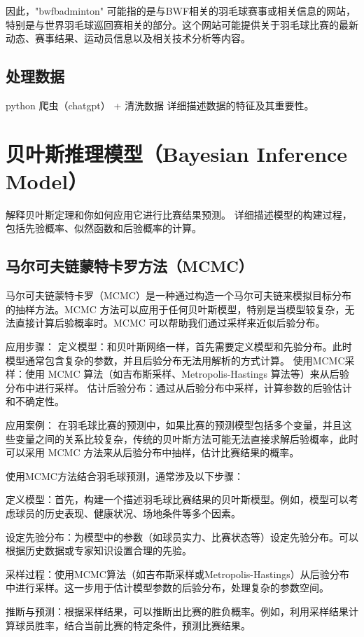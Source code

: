 \documentclass[12pt]{article}
\begin{document}
因此，"bwfbadminton" 可能指的是与BWF相关的羽毛球赛事或相关信息的网站，特别是与世界羽毛球巡回赛相关的部分。这个网站可能提供关于羽毛球比赛的最新动态、赛事结果、运动员信息以及相关技术分析等内容。


\subsection{处理数据}
python 爬虫（chatgpt） + 清洗数据
详细描述数据的特征及其重要性。


\section{贝叶斯推理模型（Bayesian Inference Model）}


解释贝叶斯定理和你如何应用它进行比赛结果预测。
详细描述模型的构建过程，包括先验概率、似然函数和后验概率的计算。

\subsection{马尔可夫链蒙特卡罗方法（MCMC）}
马尔可夫链蒙特卡罗（MCMC）是一种通过构造一个马尔可夫链来模拟目标分布的抽样方法。MCMC 方法可以应用于任何贝叶斯模型，特别是当模型较复杂，无法直接计算后验概率时。MCMC 可以帮助我们通过采样来近似后验分布。

应用步骤：
定义模型：和贝叶斯网络一样，首先需要定义模型和先验分布。此时模型通常包含复杂的参数，并且后验分布无法用解析的方式计算。
使用MCMC采样：使用 MCMC 算法（如吉布斯采样、Metropolis-Hastings 算法等）来从后验分布中进行采样。
估计后验分布：通过从后验分布中采样，计算参数的后验估计和不确定性。

应用案例：
在羽毛球比赛的预测中，如果比赛的预测模型包括多个变量，并且这些变量之间的关系比较复杂，传统的贝叶斯方法可能无法直接求解后验概率，此时可以采用 MCMC 方法来从后验分布中抽样，估计比赛结果的概率。

使用MCMC方法结合羽毛球预测，通常涉及以下步骤：

定义模型：首先，构建一个描述羽毛球比赛结果的贝叶斯模型。例如，模型可以考虑球员的历史表现、健康状况、场地条件等多个因素。

设定先验分布：为模型中的参数（如球员实力、比赛状态等）设定先验分布。可以根据历史数据或专家知识设置合理的先验。

采样过程：使用MCMC算法（如吉布斯采样或Metropolis-Hastings）从后验分布中进行采样。这一步用于估计模型参数的后验分布，处理复杂的参数空间。

推断与预测：根据采样结果，可以推断出比赛的胜负概率。例如，利用采样结果计算球员胜率，结合当前比赛的特定条件，预测比赛结果。
\end{document}
